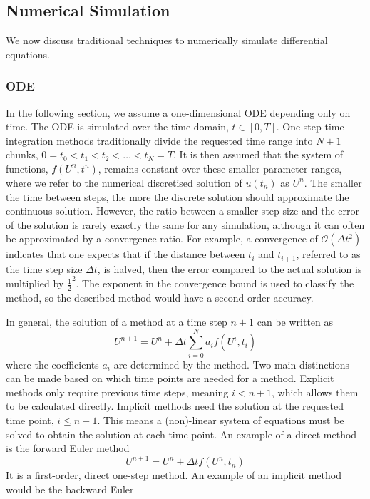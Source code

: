 \subsection{Numerical Simulation}
We now discuss traditional techniques to numerically simulate differential equations. 
\subsubsection{ODE}
In the following section, we assume a one-dimensional ODE depending only on time. The ODE is simulated over the time domain, $t \in [0, T]$. One-step time integration methods traditionally divide the requested time range into $N + 1$ chunks, $0 = t_0 < t_1 < t_2 < \hdots < t_{N} = T$. It is then assumed that the system of functions, $f(U^n,t^n)$, remains constant over these smaller parameter ranges, where we refer to the numerical discretised solution of $u(t_n)$ as $U^n$. The smaller the time between steps, the more the discrete solution should approximate the continuous solution. However, the ratio between a smaller step size and the error of the solution is rarely exactly the same for any simulation, although it can often be approximated by a convergence ratio. For example, a convergence of $\mathcal{O}(\Delta t^2)$ indicates that one expects that if the distance between $t_i$ and $t_{i+1}$, referred to as the time step size $\Delta t$, is halved, then the error compared to the actual solution is multiplied by $\frac{1}{2}^2$. The exponent in the convergence bound is used to classify the method, so the described method would have a second-order accuracy. 

In general, the solution of a method at a time step $n+1$ can be written as
\[
U^{n+1} = U^n + \Delta t \sum_{i=0}^N a_i f(U^i,t_i)
\]
where the coefficients $a_i$ are determined by the method. 
Two main distinctions can be made based on which time points are needed for a method. Explicit methods only require previous time steps, meaning $i < n+1$, which allows them to be calculated directly. Implicit methods need the solution at the requested time point, $i \le n+1$. This means a (non)-linear system of equations must be solved to obtain the solution at each time point. An example of a direct method is the forward Euler method
\begin{equation}
\label{eq: forward Euler}
    U^{n+1} = U^n + \Delta t f(U^n,t_n)
\end{equation}
It is a first-order, direct one-step method. An example of an implicit method would be the backward Euler

